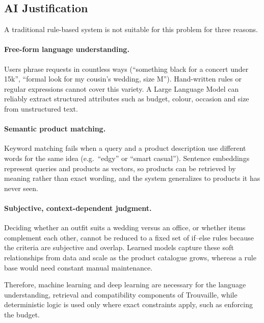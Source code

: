 \subsection{AI Justification}
A traditional rule-based system is not suitable for this problem for three reasons.

\paragraph{Free-form language understanding.} Users phrase requests in countless ways (``something black for a concert under 15k'', ``formal look for my cousin's wedding, size M''). Hand-written rules or regular expressions cannot cover this variety. A Large Language Model can reliably extract structured attributes such as budget, colour, occasion and size from unstructured text.

\paragraph{Semantic product matching.} Keyword matching fails when a query and a product description use different words for the same idea (e.g.\ ``edgy'' or ``smart casual''). Sentence embeddings represent queries and products as vectors, so products can be retrieved by meaning rather than exact wording, and the system generalizes to products it has never seen.

\paragraph{Subjective, context-dependent judgment.} Deciding whether an outfit suits a wedding versus an office, or whether items complement each other, cannot be reduced to a fixed set of if--else rules because the criteria are subjective and overlap. Learned models capture these soft relationships from data and scale as the product catalogue grows, whereas a rule base would need constant manual maintenance.

Therefore, machine learning and deep learning are necessary for the language understanding, retrieval and compatibility components of Trouvaille, while deterministic logic is used only where exact constraints apply, such as enforcing the budget.

